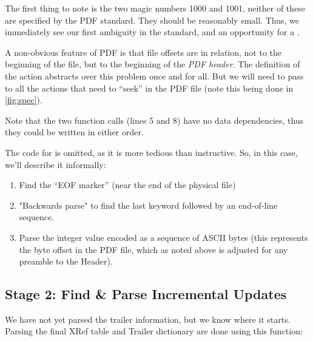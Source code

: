 The first thing to note is the two magic numbers 1000 and 1001, neither of
these are specified by the PDF standard. They should be reasonably
small.  Thus, we immediately see our first ambiguity in the standard,
and an opportunity for a \pd{}.

A non-obvious feature of PDF is that file offsets are in relation, not
to the beginning of the file, but to the beginning of the \emph{PDF header}.
%
The definition of the action  abstracts over this problem once and for all.
But we will need to pass  to all the actions that need to
``seek'' in the PDF file (note this being done in \cref{fig:spec}).

Note that the two function calls (lines 5 and 8) have no data
dependencies, thus they could be written in either order.

The code for  is
omitted, as it is more tedious than instructive.
So, in this case, we'll describe it informally:
\begin{enumerate}
\item Find the ``EOF marker''  (near the end of the physical
  file)
\item "Backwards parse" to find the last 
  keyword followed by an end-of-line sequence.
\item Parse the integer value encoded as a sequence of ASCII bytes
  (this represents the byte offset in the PDF file, which as noted
  above is adjusted for any preamble to the Header).
\end{enumerate}


\subsection{Stage 2: Find \& Parse Incremental Updates}

We have not yet parsed the trailer information, but we know where
it starts.  Parsing the final XRef table and Trailer dictionary are
done using this function:

\lstset{numbers=right}
\lstset{numbers=none}


